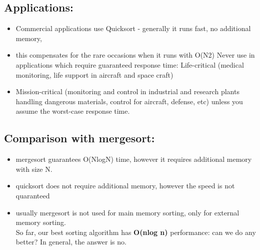 \documentclass[10pt,a4paper]{article}
\begin{document}
	\subsection{ Applications:}
	\begin{itemize}
		\item Commercial applications use Quicksort - generally it runs fast, no additional memory, 
		\item this compensates for the rare occasions when it runs with O(N2)
		Never use in applications which require guaranteed response time:
		Life-critical (medical monitoring, life support in aircraft and space craft) 
		\item Mission-critical (monitoring and control in industrial and research plants handling dangerous materials, control for aircraft, defense, etc) 
		unless you assume the worst-case response time.
	\end{itemize}      
	\subsection{ Comparison with mergesort: }
	\begin{itemize}
		\item 
		mergesort guarantees O(NlogN) time, however it requires additional memory with size N. 
		\item quicksort does not require additional memory, however the speed is not quaranteed 
		\item usually mergesort is not used for main memory sorting, only for external memory sorting. \\
		So far, our best sorting algorithm has \textbf{O(nlog n)} performance: can we do any better? 
		In general, the answer is no.
	\end{itemize}
\end{document}
